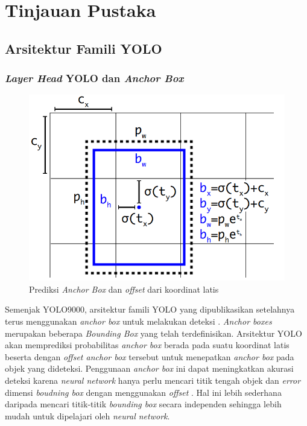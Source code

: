 \section{Tinjauan Pustaka}
\subsection{Arsitektur Famili YOLO}
  \subsubsection{\emph{Layer Head} YOLO dan \emph{Anchor Box}}
    \begin{figure}[ht]
        \centering
        \includegraphics[scale=0.4]{pictures/anchorbox.png}
        \caption{Prediksi \emph{Anchor Box} dan \emph{offset} dari koordinat latis}
        \label{fig:anchorbox}
    \end{figure}
    Semenjak YOLO9000, arsitektur famili YOLO yang dipublikasikan setelahnya terus menggunakan \emph{anchor box} untuk melakukan deteksi \parencites{yolov2}{yolov3}{yolov4}{scaledyolov4}{yolov5}{yolor}{yolov7}.
    \emph{Anchor boxes} merupakan beberapa \emph{Bounding Box} yang telah terdefinisikan. 
    Arsitektur YOLO akan memprediksi probabilitas \emph{anchor box} berada pada suatu koordinat latis beserta dengan \emph{offset anchor box} tersebut untuk menepatkan \emph{anchor box} pada objek yang dideteksi.
    Penggunaan \emph{anchor box} ini dapat meningkatkan akurasi deteksi karena \emph{neural network} hanya perlu mencari titik tengah objek dan \emph{error} dimensi \emph{boudning box} dengan menggunakan \emph{offset} \parencite{yolov3}.
    Hal ini lebih sederhana daripada mencari titik-titik \emph{bounding box} secara independen sehingga lebih mudah untuk dipelajari oleh \emph{neural network}.

